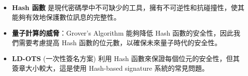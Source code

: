 \documentclass[
]{article}
\providecommand{\tightlist}{%
  \setlength{\itemsep}{0pt}\setlength{\parskip}{0pt}}
\begin{document}
\begin{itemize}
\tightlist
\item
  \textbf{Hash 函數}
  是現代密碼學中不可缺少的工具，擁有不可逆性和抗碰撞性，使其能夠有效地保護數位訊息的完整性。
\item
  \textbf{量子計算的威脅}：Grover's Algorithm 能夠降低 Hash
  函數的安全性，因此我們需要考慮提高 Hash
  函數的位元數，以確保未來量子時代的安全性。
\item
  \textbf{LD-OTS} (一次性簽名方案) 利用 Hash
  函數來保證每個位元的安全性，但其簽章大小較大，這是使用 Hash-based
  signature 系統的常見問題。
\end{itemize}
\end{document}
